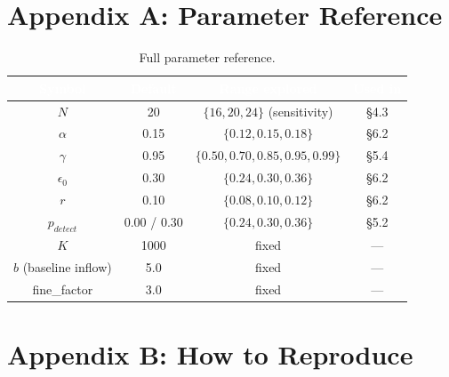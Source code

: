 \documentclass[12pt, a4paper]{article}
\begin{document}
\newpage
\section*{Appendix A: Parameter Reference}

\begin{table}[H]
    \centering
    \renewcommand{\arraystretch}{1.3}
    \begin{tabular}{|c|c|c|c|}
        \hline
        \rowcolor{nutDark} \textcolor{white}{\textbf{Symbol}} & \textcolor{white}{\textbf{Default}} & \textcolor{white}{\textbf{Range explored}} & \textcolor{white}{\textbf{Used in}} \\ \hline
        $N$            & 20         & $\{16, 20, 24\}$ (sensitivity)         & \S 4.3 \\ \hline
        $\alpha$       & 0.15       & $\{0.12, 0.15, 0.18\}$                 & \S 6.2 \\ \hline
        $\gamma$       & 0.95       & $\{0.50, 0.70, 0.85, 0.95, 0.99\}$     & \S 5.4 \\ \hline
        $\epsilon_0$   & 0.30       & $\{0.24, 0.30, 0.36\}$                 & \S 6.2 \\ \hline
        $r$            & 0.10       & $\{0.08, 0.10, 0.12\}$                 & \S 6.2 \\ \hline
        $p_{detect}$   & 0.00 / 0.30 & $\{0.24, 0.30, 0.36\}$                & \S 5.2 \\ \hline
        $K$            & 1000       & fixed                                  & --- \\ \hline
        $b$ (baseline inflow) & 5.0 & fixed                                  & --- \\ \hline
        fine\_factor   & 3.0        & fixed                                  & --- \\ \hline
    \end{tabular}
    \caption{Full parameter reference.}
\end{table}

\section*{Appendix B: How to Reproduce}
\end{document}
